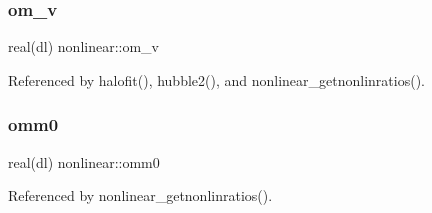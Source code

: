 \subsubsection{\texorpdfstring{om\+\_\+v}{om\_v}}
{\footnotesize\ttfamily real(dl) nonlinear\+::om\+\_\+v\hspace{0.3cm}{\ttfamily [private]}}



Referenced by halofit(), hubble2(), and nonlinear\+\_\+getnonlinratios().

\mbox{\label{namespacenonlinear_a95578ad235632d8fd2cc109867cdf329}} 
\subsubsection{\texorpdfstring{omm0}{omm0}}
{\footnotesize\ttfamily real(dl) nonlinear\+::omm0\hspace{0.3cm}{\ttfamily [private]}}



Referenced by nonlinear\+\_\+getnonlinratios().

